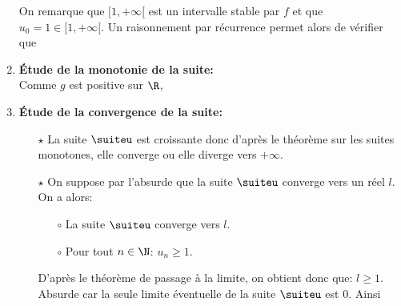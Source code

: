 \begin{correction}
\begin{enumerate}
\noindent On remarque que $[ 1,+\infty[$ est un intervalle stable par $f$ et que $u_0=1\in\lbrack 1,+\infty\lbrack$. Un raisonnement par r\'ecurrence permet alors de v\'erifier que 
\noindent 
\item \textbf{\'Etude de la monotonie de la suite:}\\
Comme $g$ est positive sur $\R$, 
\noindent 
\item \textbf{\'Etude de la convergence de la suite:}\\
\begin{itemize}
\item[$\star$] La suite $\suiteu$ est croissante donc d'apr\`{e}s le th\'eor\`{e}me sur les suites monotones, elle converge ou elle diverge vers $+\infty$.
\item[$\star$] On suppose par l'absurde que la suite $\suiteu$ converge vers un r\'eel $l$. On a alors:
\begin{itemize}
\item[$\circ$] La suite $\suiteu$ converge vers $l$.
\item[$\circ$] Pour tout $n\in\N$: $u_n\geq 1$.
\end{itemize}
D'apr\`{e}s le th\'eor\`{e}me de passage \`{a} la limite, on obtient donc que: $l\geq 1$. Absurde car la seule limite \'eventuelle de la suite $\suiteu$ est 0. Ainsi 
\end{itemize}
\end{enumerate}



\end{correction}